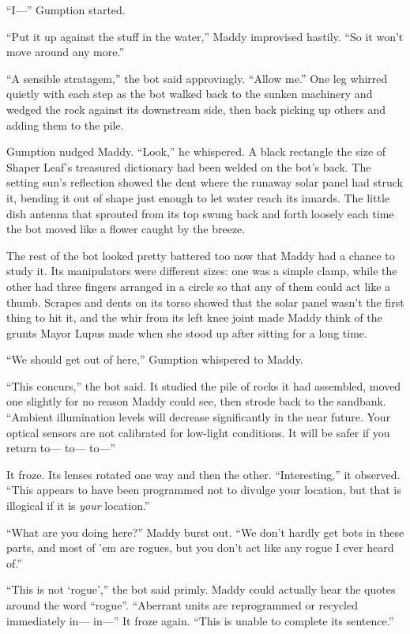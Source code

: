 \documentclass[10pt]{article}
\begin{document}
``I---'' Gumption started.

``Put it up against the stuff in the water,'' Maddy improvised hastily.
``So it won't move around any more.''

``A sensible stratagem,'' the bot said approvingly. ``Allow me.'' One
leg whirred quietly with each step as the bot walked back to the sunken
machinery and wedged the rock against its downstream side, then back
picking up others and adding them to the pile.

Gumption nudged Maddy. ``Look,'' he whispered. A black rectangle the
size of Shaper Leaf's treasured dictionary had been welded on the bot's
back. The setting sun's reflection showed the dent where the runaway
solar panel had struck it, bending it out of shape just enough to let
water reach its innards. The little dish antenna that sprouted from its
top swung back and forth loosely each time the bot moved like a flower
caught by the breeze.

The rest of the bot looked pretty battered too now that Maddy had a
chance to study it. Its manipulators were different sizes: one was a
simple clamp, while the other had three fingers arranged in a circle so
that any of them could act like a thumb. Scrapes and dents on its torso
showed that the solar panel wasn't the first thing to hit it, and the
whir from its left knee joint made Maddy think of the grunts Mayor Lupus
made when she stood up after sitting for a long time.

``We should get out of here,'' Gumption whispered to Maddy.

``This concurs,'' the bot said. It studied the pile of rocks it had
assembled, moved one slightly for no reason Maddy could see, then strode
back to the sandbank. ``Ambient illumination levels will decrease
significantly in the near future. Your optical sensors are not
calibrated for low-light conditions. It will be safer if you return
to--- to--- to---''

It froze. Its lenses rotated one way and then the other.
``Interesting,'' it observed. ``This appears to have been programmed not
to divulge your location, but that is illogical if it is \emph{your}
location.''

``What are you doing here?'' Maddy burst out. ``We don't hardly get bots
in these parts, and most of 'em are rogues, but you don't act like any
rogue I ever heard of.''

``This is not `rogue','' the bot said primly. Maddy could actually hear
the quotes around the word ``rogue''. ``Aberrant units are reprogrammed
or recycled immediately in--- in---'' It froze again. ``This is unable
to complete its sentence.''
\end{document}
